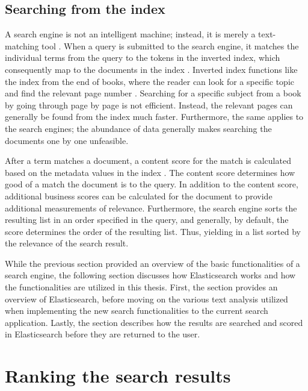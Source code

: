 \subsection{Searching from the index}
\label{ss:searchTime}
A search engine is not an intelligent machine; instead, it is merely a text-matching tool \cite{relevantSearch}. 
When a query is submitted to the search engine, it 
matches the individual terms from the query to the tokens in the inverted index, 
which consequently map to the documents in the index \cite{relevantSearch}. 
Inverted index functions like the index from the end of books, 
where the reader can look for a specific topic and find the relevant page number \cite{relevantSearch}.
Searching for a specific subject from a book by going through page by page is not efficient.
Instead, the relevant pages can generally be found from the index much faster.
Furthermore, the same applies to the search engines;
the abundance of data generally makes searching the documents one by one unfeasible.


After a term matches a document, a content score for the match is calculated based on the metadata values in the index
\cite{relevantSearch}.
The content score determines how good of a match the document is to the query.
In addition to the content score, additional business scores can be calculated for the document to provide 
additional measurements of relevance.
Furthermore, the search engine sorts the resulting list in an order specified in the query, and generally, 
by default, the score determines the order of the resulting list. 
Thus, yielding in a list sorted by the relevance of the search result.


While the previous section provided an overview of the basic functionalities of a search engine,
the following section discusses how Elasticsearch works and how the functionalities are utilized in this thesis.
First, the section provides an overview of Elasticsearch, before moving on the various text analysis 
utilized when implementing the new search functionalities to the current search application.
Lastly, the section describes how the results are searched and scored in Elasticsearch before they 
are returned to the user.




\section{Ranking the search results}
\label{sec:ranking}

